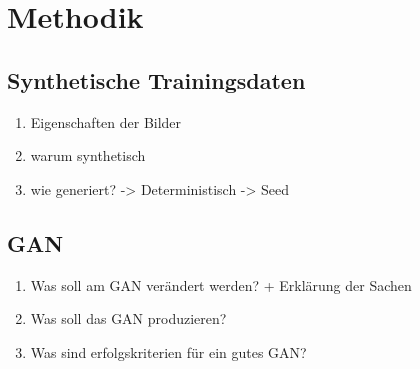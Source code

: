 \chapter{Methodik}
\section{Synthetische Trainingsdaten}
\begin{enumerate}
	\item Eigenschaften der Bilder
	\item warum synthetisch
	\item wie generiert? -> Deterministisch -> Seed
\end{enumerate}

\section{GAN}
\begin{enumerate}
	\item Was soll am GAN verändert werden? + Erklärung der Sachen
	\item Was soll das GAN produzieren?
	\item Was sind erfolgskriterien für ein gutes GAN?
\end{enumerate}
